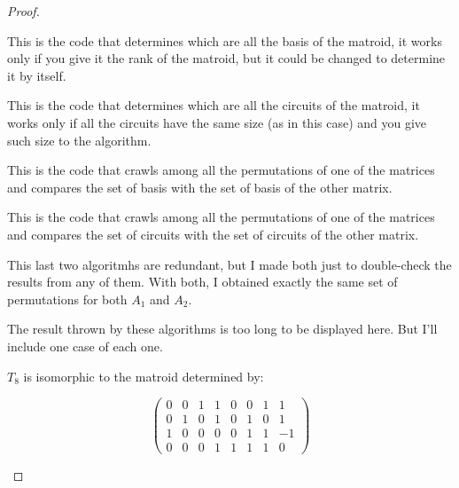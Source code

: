 \begin{proof}
\begin{enumerate}[label=(\roman*)]
            This is the code that determines which are all the basis of the matroid, it works only
            if you give it the rank of the matroid, but it could be changed to determine it by itself.
            \small
                
            \normalsize
            
            This is the code that determines which are all the circuits of the matroid, it works only if all
            the circuits have the same size (as in this case) and you give such size to the algorithm.
            \small
                
            \normalsize
            
            This is the code that crawls among all the permutations of one of the matrices and compares the set
            of basis with the set of basis of the other matrix.
            \small
                
            \normalsize
       
            This is the code that crawls among all the permutations of one of the matrices and compares the set
            of circuits with the set of circuits of the other matrix.
            \small
                
            \normalsize
            
            This last two algoritmhs are redundant, but I made both just to double-check the results from
            any of them. With both, I obtained exactly the same set of permutations for both $A_1$ and $A_2$.\pn
            
            The result thrown by these algorithms is too long to be displayed here. But I'll include one case of
            each one.\pn
            
            $T_8$ is isomorphic to the matroid determined by:
            
            \[ \left( 
                \begin{array}{cccccccc}
                   0  & 0 &  1 &  1 &  0 &  0 &  1 &  1 \\
                   0  & 1 &  0 &  1 &  0 &  1 &  0 &  1 \\
                   1  & 0 &  0 &  0 &  0 &  1 &  1 & -1 \\
                   0  & 0 &  0 &  1 &  1 &  1 &  1 &  0
                \end{array} 
            \right)\] 
            

\end{enumerate}
\end{proof}
